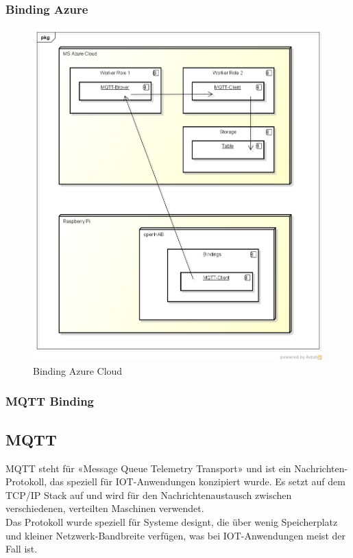 \subsubsection{Binding Azure}
\begin{figure}[h!]
	\centering
		\includegraphics[scale=0.5]{report/img/deployment_binding_azure}
	\caption{Binding Azure Cloud}
	\label{fig:deploymentAzure}
\end{figure}

\subsubsection{MQTT Binding}

\subsection{MQTT}
MQTT steht für «Message Queue Telemetry Transport» und ist ein Nachrichten-Protokoll, das speziell für IOT-Anwendungen konzipiert wurde. Es setzt auf dem TCP/IP Stack auf und wird für den Nachrichtenaustausch zwischen verschiedenen, verteilten Maschinen verwendet. \\
Das Protokoll wurde speziell für Systeme designt, die über wenig Speicherplatz und kleiner Netzwerk-Bandbreite verfügen, was bei IOT-Anwendungen meist der Fall ist.

